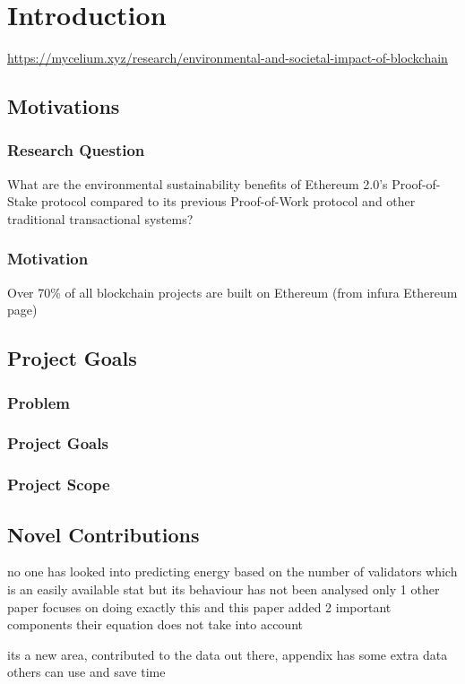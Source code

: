 \chapter{Introduction}
\url{https://mycelium.xyz/research/environmental-and-societal-impact-of-blockchain}
\section{Motivations}

\subsection{Research Question}

What are the environmental sustainability benefits of Ethereum 2.0's Proof-of-Stake protocol compared to its previous Proof-of-Work protocol and other traditional transactional systems?

\subsection{Motivation}

Over 70\% of all blockchain projects are built on Ethereum (from infura Ethereum page)


\section{Project Goals}
\subsection{Problem}
\subsection{Project Goals}
\subsection{Project Scope}

\section{Novel Contributions}

no one has looked into predicting energy based on the number of validators which is an easily available stat but its behaviour has not been analysed
only 1 other paper focuses on doing exactly this and this paper added 2 important components their equation does not take into account

its a new area, contributed to the data out there, appendix has some extra data others can use and save time